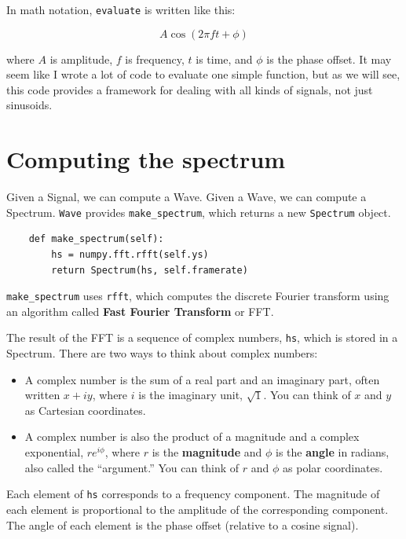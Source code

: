 \documentclass[12pt]{book}
\begin{document}
In math notation, {\tt evaluate} is written like this:

\[ A \cos (2 \pi f t + \phi) \]

where $A$ is amplitude, $f$ is frequency, $t$ is time, and $\phi$
is the phase offset.  It may seem like I wrote a lot of code
to evaluate one simple function, but as we will see, this code
provides a framework for dealing with all kinds of signals, not
just sinusoids.


\section{Computing the spectrum}

Given a Signal, we can compute a Wave.  Given a Wave, we can compute
a Spectrum.  {\tt Wave} provides \verb"make_spectrum", which returns
a new {\tt Spectrum} object.

\begin{verbatim}
    def make_spectrum(self):
        hs = numpy.fft.rfft(self.ys)
        return Spectrum(hs, self.framerate)
\end{verbatim}

\verb"make_spectrum" uses {\tt rfft}, which computes
the discrete Fourier transform using an algorithm called
{\bf Fast Fourier Transform} or FFT.

The result of the FFT is a sequence of complex numbers, {\tt hs},
which is stored in a Spectrum.  There are two ways to think about
complex numbers:

\begin{itemize}

\item A complex number is the sum of a real part and an imaginary
part, often written $x + iy$, where $i$ is the imaginary unit, $\sqrt{1}$.
You can think of $x$ and $y$ as Cartesian coordinates.

\item A complex number is also the product of a magnitude
and a complex exponential, $r e^{i \phi}$, where $r$ is the
{\bf magnitude} and $\phi$ is the
{\bf angle} in radians, also called the ``argument.''   You
can think of $r$ and $\phi$ as polar coordinates.

\end{itemize}

Each element of {\tt hs} corresponds to a
frequency component.  The magnitude of each element is proportional
to the amplitude of the corresponding component.
The angle of each element is the phase offset (relative to a cosine
signal).
\end{document}

